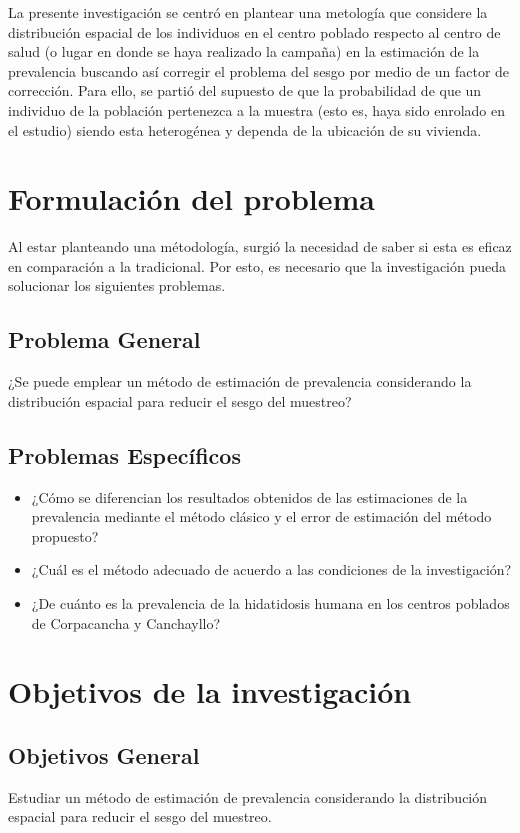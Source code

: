 La presente investigación se centró en plantear una metología que considere la distribución espacial de los individuos en el centro poblado respecto al centro de salud (o lugar en donde se haya realizado la campaña) en la estimación de la prevalencia buscando así corregir el problema del sesgo por medio de un factor de corrección. Para ello, se partió del supuesto de que la probabilidad de que un individuo de la población pertenezca a la muestra (esto es, haya sido enrolado en el estudio) siendo esta heterogénea y dependa de la ubicación de su vivienda.

\newpage

\section{Formulación del problema}
Al estar planteando una métodología, surgió la necesidad de saber si esta es eficaz en comparación a la tradicional. Por esto, es necesario que la investigación pueda solucionar los siguientes problemas.
\subsection{Problema General}
¿Se puede emplear un método de estimación de prevalencia considerando la distribución espacial para reducir el sesgo del muestreo?
\subsection{Problemas Específicos}
\begin{itemize}
    \item ¿Cómo se diferencian los resultados obtenidos de las estimaciones de la prevalencia mediante el método clásico y el error de estimación del método propuesto?
    \item ¿Cuál es el método adecuado de acuerdo a las condiciones de la investigación?
    \item ¿De cuánto es la prevalencia de la hidatidosis humana en los centros poblados de Corpacancha y Canchayllo?
\end{itemize}
\newpage
\section{Objetivos de la investigación}
\subsection{Objetivos General}
Estudiar un método de estimación de prevalencia considerando la distribución espacial para reducir el sesgo del muestreo.
